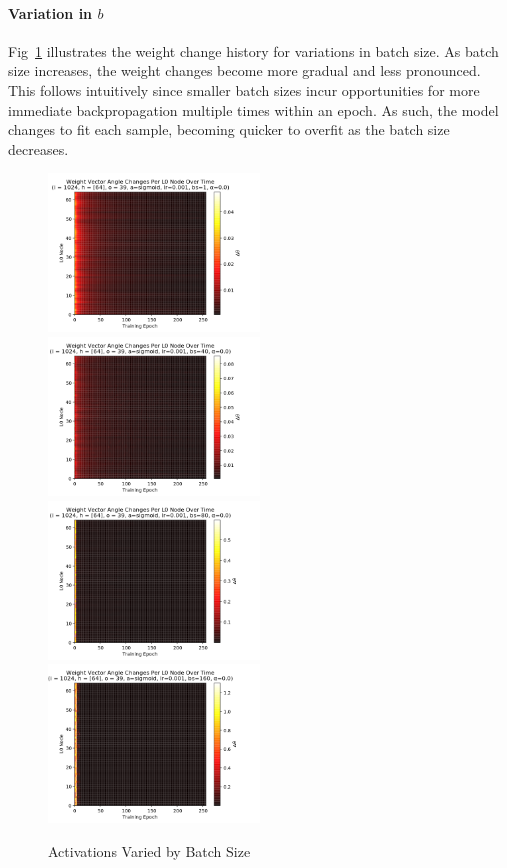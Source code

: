 \documentclass[10pt,epsf]{article}
\begin{document}
{{    \paragraph{Variation in $b$}{
      Fig~\ref{fig:dw-by-b} illustrates the weight change history for variations in batch size.
      As batch size increases, the weight changes become more gradual and less pronounced. This follows
      intuitively since smaller batch sizes incur opportunities for more immediate backpropagation
      multiple times within an epoch. As such, the model changes to fit each sample, becoming quicker
      to overfit as the batch size decreases.
    }
    \begin{figure}[h]
      \includegraphics[width=0.5\textwidth]{./img/64-0.001-1-0-sigmoid-1/weight-angle-changes-L0-255.png}
      \includegraphics[width=0.5\textwidth]{./img/64-0.001-40-0-sigmoid-1/weight-angle-changes-L0-255.png}
      \includegraphics[width=0.5\textwidth]{./img/64-0.001-80-0-sigmoid-1/weight-angle-changes-L0-255.png}
      \includegraphics[width=0.5\textwidth]{./img/64-0.001-160-0-sigmoid-1/weight-angle-changes-L0-255.png}
      \caption{Activations Varied by Batch Size}
      \label{fig:dw-by-b}
    \end{figure}
}}
\end{document}
